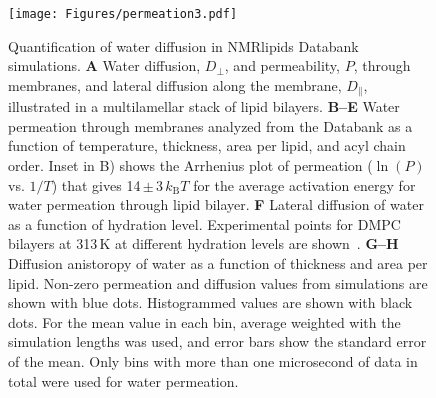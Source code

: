\documentclass[fleqn,10pt]{wlscirep}
\begin{document}
\begin{figure}[tb]
    \centering
    \texttt{[image: Figures/permeation3.pdf]}
    \caption{Quantification of water diffusion in NMRlipids Databank simulations.
    \textbf{A} Water diffusion, $D_\perp$, and permeability, $P$, through membranes, and lateral diffusion along the membrane, $D_\parallel$, illustrated in a multilamellar stack of lipid bilayers. 
    \textbf{B--E} Water permeation through membranes analyzed from the Databank as a function of temperature, thickness, area per lipid, and acyl chain order. Inset in B) shows the Arrhenius plot of permeation ($\ln(P)$ vs. $1/T$) that gives 14\,$\pm$\,3\,$k_\mathrm{B}T$ for the average activation energy for water permeation through lipid bilayer. 
    \textbf{F} Lateral diffusion of water as a function of hydration level. Experimental points for DMPC bilayers at 313\,K at different hydration levels are shown~\cite{rudakova04}.
    \textbf{G--H} Diffusion anistoropy of water as a function of thickness and area per lipid. 
    Non-zero permeation and diffusion values from simulations are shown with blue dots. Histogrammed values are shown with black dots. For the mean value in each bin, average weighted with the simulation lengths was used, and error bars show the standard error of the mean. Only bins with more than one microsecond of data in total were used for water permeation.}
    \label{fig:permeability}
\end{figure}
\end{document}
